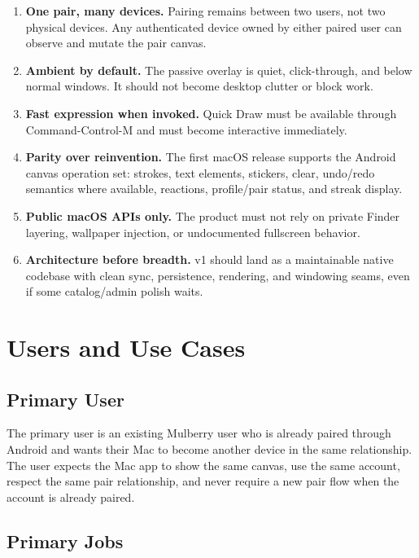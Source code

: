 \documentclass[11pt]{article}
\begin{document}
\begin{enumerate}
  \item \textbf{One pair, many devices.} Pairing remains between two users, not two physical devices. Any authenticated device owned by either paired user can observe and mutate the pair canvas.
  \item \textbf{Ambient by default.} The passive overlay is quiet, click-through, and below normal windows. It should not become desktop clutter or block work.
  \item \textbf{Fast expression when invoked.} Quick Draw must be available through Command-Control-M and must become interactive immediately.
  \item \textbf{Parity over reinvention.} The first macOS release supports the Android canvas operation set: strokes, text elements, stickers, clear, undo/redo semantics where available, reactions, profile/pair status, and streak display.
  \item \textbf{Public macOS APIs only.} The product must not rely on private Finder layering, wallpaper injection, or undocumented fullscreen behavior.
  \item \textbf{Architecture before breadth.} v1 should land as a maintainable native codebase with clean sync, persistence, rendering, and windowing seams, even if some catalog/admin polish waits.
\end{enumerate}

\section{Users and Use Cases}

\subsection{Primary User}

The primary user is an existing Mulberry user who is already paired through Android and wants their Mac to become another device in the same relationship. The user expects the Mac app to show the same canvas, use the same account, respect the same pair relationship, and never require a new pair flow when the account is already paired.

\subsection{Primary Jobs}
\end{document}
